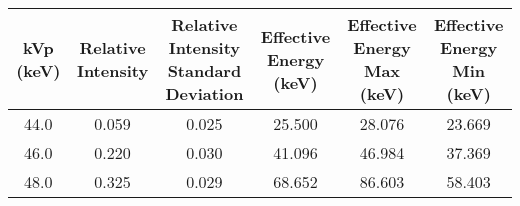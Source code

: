 \begin{tabular}{cccccc}
\toprule
 kVp (keV) &  Relative Intensity &  Relative Intensity Standard Deviation &  Effective Energy (keV) &  Effective Energy Max (keV) &  Effective Energy Min (keV) \\
\midrule
      44.0 &               0.059 &                                  0.025 &                  25.500 &                      28.076 &                      23.669 \\
      46.0 &               0.220 &                                  0.030 &                  41.096 &                      46.984 &                      37.369 \\
      48.0 &               0.325 &                                  0.029 &                  68.652 &                      86.603 &                      58.403 \\
\bottomrule
\end{tabular}
